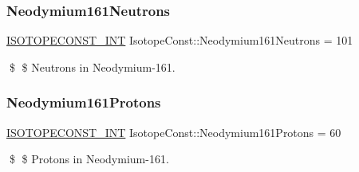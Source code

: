\subsubsection{\texorpdfstring{Neodymium161\+Neutrons}{Neodymium161Neutrons}}
{\footnotesize\ttfamily \mbox{\hyperlink{group___isotope_const-_macros_ga5f18360b3e99483a35c32d789e62621c}{I\+S\+O\+T\+O\+P\+E\+C\+O\+N\+S\+T\+\_\+\+I\+NT}} Isotope\+Const\+::\+Neodymium161\+Neutrons = 101}

\$ \$ Neutrons in Neodymium-\/161. \mbox{\label{group___isotope_const-_neodymium-_nd161_ga253b8d5e2abe22d20e736e8b932acbdc}} 
\subsubsection{\texorpdfstring{Neodymium161\+Protons}{Neodymium161Protons}}
{\footnotesize\ttfamily \mbox{\hyperlink{group___isotope_const-_macros_ga5f18360b3e99483a35c32d789e62621c}{I\+S\+O\+T\+O\+P\+E\+C\+O\+N\+S\+T\+\_\+\+I\+NT}} Isotope\+Const\+::\+Neodymium161\+Protons = 60}

\$ \$ Protons in Neodymium-\/161. 